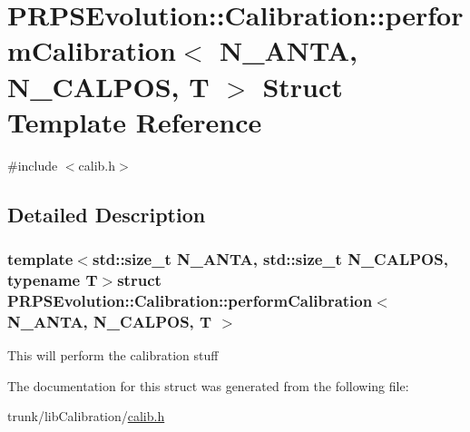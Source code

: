 \hypertarget{struct_p_r_p_s_evolution_1_1_calibration_1_1perform_calibration}{\section{P\-R\-P\-S\-Evolution\-:\-:Calibration\-:\-:perform\-Calibration$<$ N\-\_\-\-A\-N\-T\-A, N\-\_\-\-C\-A\-L\-P\-O\-S, T $>$ Struct Template Reference}
\label{struct_p_r_p_s_evolution_1_1_calibration_1_1perform_calibration}
}


{\ttfamily \#include $<$calib.\-h$>$}



\subsection{Detailed Description}
\subsubsection*{template$<$std\-::size\-\_\-t N\-\_\-\-A\-N\-T\-A, std\-::size\-\_\-t N\-\_\-\-C\-A\-L\-P\-O\-S, typename T$>$struct P\-R\-P\-S\-Evolution\-::\-Calibration\-::perform\-Calibration$<$ N\-\_\-\-A\-N\-T\-A, N\-\_\-\-C\-A\-L\-P\-O\-S, T $>$}

This will perform the calibration stuff 

The documentation for this struct was generated from the following file\-:\begin{DoxyCompactItemize}
\item 
trunk/lib\-Calibration/\hyperlink{calib_8h}{calib.\-h}\end{DoxyCompactItemize}
